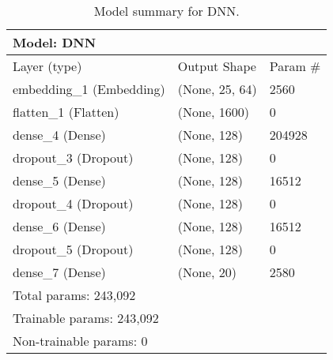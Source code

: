 \begin{table}[] \centering  \begin{tabular}{lll}  Model: DNN \\ \hline  Layer (type)                   & Output Shape                & Param \#    \\ \hline \hline  embedding\_1 (Embedding)        & (None, 25, 64)              & 2560       \\ \hline  flatten\_1 (Flatten)            & (None, 1600)                & 0          \\ \hline  dense\_4 (Dense)                & (None, 128)                 & 204928     \\ \hline  dropout\_3 (Dropout)            & (None, 128)                 & 0          \\ \hline  dense\_5 (Dense)                & (None, 128)                 & 16512      \\ \hline  dropout\_4 (Dropout)            & (None, 128)                 & 0          \\ \hline  dense\_6 (Dense)                & (None, 128)                 & 16512      \\ \hline  dropout\_5 (Dropout)            & (None, 128)                 & 0          \\ \hline  dense\_7 (Dense)                & (None, 20)                  & 2580       \\ \hline \hline  Total params: 243,092 \\  Trainable params: 243,092 \\  Non-trainable params: 0 \\ \hline  \end{tabular}  \caption{Model summary for DNN.}  \label{tab:model-DNN}  \end{table}
